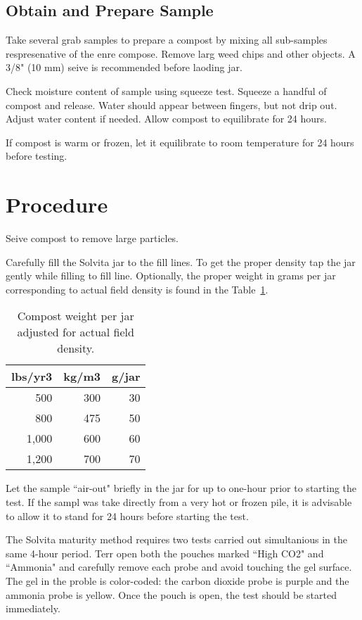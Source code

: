 \documentclass[12pt]{../SOP4_alpha}\usepackage[]{graphicx}\usepackage[]{xcolor}
\begin{document}
\subsection{Obtain and Prepare Sample}

\NP Take several grab samples to prepare a compost by mixing all sub-samples respresenative of the enre compose. Remove larg weed chips and other objects. A 3/8" (10 mm) seive is recommended before laoding jar.

\NP Check moisture content of sample using squeeze test. Squeeze a handful of compost and release. Water should appear between fingers, but not drip out. Adjust water content if needed. Allow compost to equilibrate for 24 hours.

\NP If compost is warm or frozen, let it equilibrate to room temperature for 24 hours before testing.


\section{Procedure}

\NP Seive compost to remove large particles.

\NP Carefully fill the Solvita jar to the fill lines. To get the proper density tap the jar gently while filling to fill line. Optionally, the proper weight in grams per jar corresponding to actual field density is found in the Table~\ref{tab:jarweight}.

\begin{table}[ht]
\caption{Compost weight per jar adjusted for actual field density.}
\label{tab:jarweight}
\centering
\begin{tabular}{rrr}
  \hline
 \textbf{lbs/yr3} & \textbf{kg/m3} & \textbf{g/jar} \\ 
  \hline \hline
  500   & 300   & 30 \\
  800   & 475   & 50 \\
  1,000 & 600   & 60 \\
  1,200 & 700   & 70 \\ \hline
\end{tabular}
\end{table}


\NP Let the sample ``air-out" briefly in the jar for up to one-hour prior to starting the test. If the sampl was take directly from a very hot or frozen pile, it is advisable to allow it to stand for 24 hours before starting the test. 

\NP The Solvita maturity method requires two tests carried out simultanious in the same 4-hour period. Terr open both the pouches marked ``High CO2" and ``Ammonia" and carefully remove each probe and avoid touching the gel surface. The gel in the proble is color-coded: the carbon dioxide probe is purple and the ammonia probe is yellow. Once the pouch is open, the test should be started immediately. 
\end{document}
